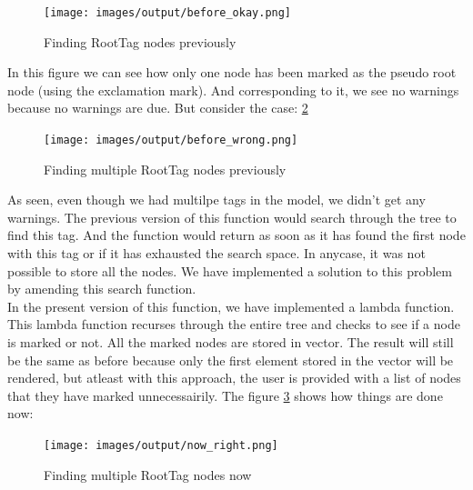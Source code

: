 \begin{figure}
	\centering
	\texttt{[image: images/output/before\_okay.png]}
	\caption{Finding RootTag nodes previously}
	\label{fig:before_okay}
\end{figure}
In this figure we can see how only one node has been marked as the pseudo root node (using the exclamation mark). And corresponding to it, we see no warnings because no warnings are due. But consider the case: \ref{fig:before_wrong}\\
\begin{figure}
	\centering
	\texttt{[image: images/output/before\_wrong.png]}
	\caption{Finding multiple RootTag nodes previously}
	\label{fig:before_wrong}
\end{figure}
As seen, even though we had multilpe tags in the model, we didn't get any warnings.
The previous version of this function would search through the tree to find this tag. And the function would return as soon as it has found the first node with this tag or if it has exhausted the search space. In anycase, it was not possible to store all the nodes. We have implemented a solution to this problem by amending this search function.\\
In the present version of this function, we have implemented a lambda function. This lambda function recurses through the entire tree and checks to see if a node is marked or not. All the marked nodes are stored in vector. The result will still be the same as before because only the first element stored in the vector will be rendered, but atleast with this approach, the user is provided with a list of nodes that they have marked unnecessairily. The figure \ref{fig:now_right} shows how things are done now:\\
\begin{figure}
	\centering
	\texttt{[image: images/output/now\_right.png]}
	\caption{Finding multiple RootTag nodes now}
	\label{fig:now_right}
\end{figure}
